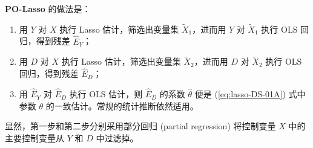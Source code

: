 \textbf{PO-Lasso} 的做法是：\label{page:lasso-polasso}

\begin{enumerate}
\item 用 $Y$ 对 $X$ 执行 Lasso 估计，筛选出变量集 $\widetilde{X}_1$，进而用 $Y$ 对 $\widetilde{X}_1$ 执行 OLS 回归，得到残差 $\widehat{E}_Y$；
\item 用 $D$ 对 $X$ 执行 Lasso 估计，筛选出变量集 $\widetilde{X}_2$，进而用 $D$ 对 $\widetilde{X}_2$ 执行 OLS 回归，得到残差 $\widehat{E}_D$；
\item 用 $\widehat{E}_Y$ 对 $\widehat{E}_D$ 执行 OLS 估计，则 $\widehat{E}_D$ 的系数 $\widehat{\theta}$ 便是 (\ref{eq:lasso-DS-01A}) 式中参数 $\theta$ 的一致估计。常规的统计推断依然适用。
\end{enumerate}

显然，第一步和第二步分别采用部分回归 (partial regression) 将控制变量 $X$ 中的主要控制变量从 $Y$ 和 $D$ 中过滤掉。
 


